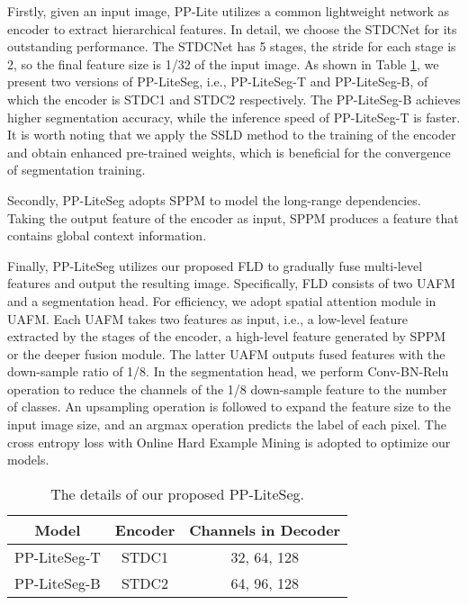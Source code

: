 \documentclass[10pt,twocolumn,letterpaper]{article}
\begin{document}
Firstly, given an input image, PP-Lite utilizes a common lightweight network as encoder to extract hierarchical features.
In detail, we choose the STDCNet \cite{fan2021rethinking} for its outstanding performance.
The STDCNet has 5 stages, the stride for each stage is 2, so the final feature size is 1/32 of the input image. 
As shown in Table \ref{tab:ppliteseg_details}, we present two versions of PP-LiteSeg, i.e., PP-LiteSeg-T and PP-LiteSeg-B, of which the encoder is STDC1 and STDC2 respectively.
The PP-LiteSeg-B achieves higher segmentation accuracy, while the inference speed of PP-LiteSeg-T is faster.
It is worth noting that we apply the SSLD \cite{cui2021beyond} method to the training of the encoder and obtain enhanced pre-trained weights, which is beneficial for the convergence of segmentation training.

Secondly, PP-LiteSeg adopts SPPM to model the long-range dependencies. Taking the output feature of the encoder as input, SPPM produces a feature that contains global context information.

Finally, PP-LiteSeg utilizes our proposed FLD to gradually fuse multi-level features and output the resulting image.
Specifically, FLD consists of two UAFM and a segmentation head.
For efficiency, we adopt spatial attention module in UAFM.
Each UAFM takes two features as input, i.e., a low-level feature extracted by the stages of the encoder, a high-level feature generated by SPPM or the deeper fusion module.
The latter UAFM outputs fused features with the down-sample ratio of 1/8.
In the segmentation head, we perform Conv-BN-Relu operation to reduce the channels of the 1/8 down-sample feature to the number of classes.
An upsampling operation is followed to expand the feature size to the input image size, and an argmax operation predicts the label of each pixel.
The cross entropy loss with Online Hard Example Mining is adopted to optimize our models.

\begin{table}
  \centering
  \small
  \begin{tabular}{c | c c}
    \hline
    Model & Encoder & Channels in Decoder \\
    \hline
    PP-LiteSeg-T & STDC1 & 32, 64, 128 \\
    PP-LiteSeg-B & STDC2 & 64, 96, 128 \\
    \hline
  \end{tabular}
  \caption{The details of our proposed PP-LiteSeg.}
  \label{tab:ppliteseg_details}
\end{table}
\end{document}
